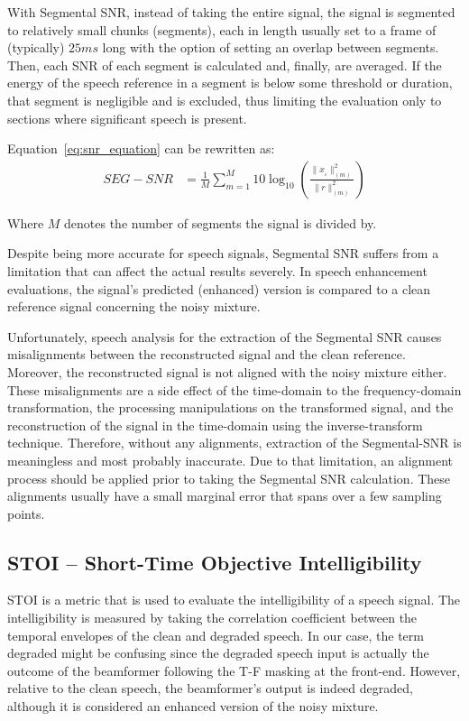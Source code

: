 With Segmental SNR\cite{10.5555/912256}, instead of taking the entire signal,
the signal is segmented to relatively small chunks (segments), 
each in length usually set to a frame of (typically) \(25ms\) long
with the option of setting an overlap
between segments.
Then, each SNR of each segment is calculated and, finally,
are averaged. 
If the energy of the speech reference 
in a segment is below some threshold or duration,
that segment is negligible and is excluded,
thus limiting the evaluation only to sections 
where significant speech is present. 


Equation~\ref{eq:snr_equation} can be rewritten as:
\begin{align}
    SEG-SNR & = \frac{1}{M}\sum_{m=1}^{M}
                10\log_{10} 
                \left(
                    \frac{ \| x_{_{s}} \|^{2}_{(m)}}{\| r \|^{2}_{(m)}} 
                \right)
\end{align}

Where \(M\) denotes the number of segments the signal is divided by.


Despite being more accurate for speech signals, Segmental SNR 
suffers from a limitation that can affect the actual results severely. 
In speech enhancement evaluations, the signal's predicted (enhanced) version is 
compared to a clean reference signal 
concerning the noisy mixture.

Unfortunately, speech analysis for the extraction of
the Segmental SNR causes misalignments between 
the reconstructed signal and the clean reference. 
Moreover, the reconstructed signal is not aligned 
with the noisy mixture either. 
These misalignments 
are a side effect of the time-domain 
to the frequency-domain transformation, 
the processing manipulations on the transformed signal, 
and the reconstruction of the signal in 
the time-domain using the inverse-transform technique. 
Therefore, without any alignments, extraction of the Segmental-SNR
is meaningless and most probably inaccurate. 
Due to that limitation, an alignment process should be applied
prior to taking the Segmental SNR calculation. These alignments usually 
have a small marginal error that spans over a few sampling points.

\subsection{STOI -- Short-Time Objective Intelligibility}
STOI\cite{5495701} is a metric that is used to evaluate 
the intelligibility of a speech signal.
The intelligibility is measured by taking the correlation
coefficient between the temporal envelopes of the clean
and degraded speech. In our case, the term degraded might
be confusing since the degraded speech input
is actually the outcome of the beamformer
following the T-F masking at the front-end.
However, relative to the clean speech, 
the beamformer's output is indeed degraded, although
it is considered an enhanced version of the noisy mixture.

